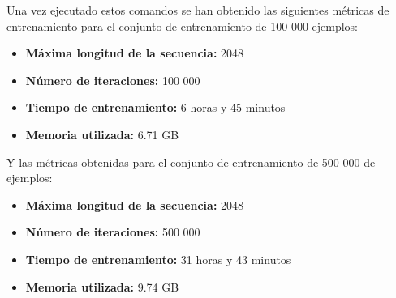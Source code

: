 Una vez ejecutado estos comandos se han obtenido las siguientes métricas de entrenamiento
para el conjunto de entrenamiento de 100 000 ejemplos:

\begin{itemize}
    \item \textbf{Máxima longitud de la secuencia:} 2048
    \item \textbf{Número de iteraciones:} 100 000
    \item \textbf{Tiempo de entrenamiento:} 6 horas y 45 minutos
    \item \textbf{Memoria utilizada:} 6.71 GB
\end{itemize}

Y las métricas obtenidas para el conjunto de entrenamiento de 500 000 de ejemplos:

\begin{itemize}
    \item \textbf{Máxima longitud de la secuencia:} 2048
    \item \textbf{Número de iteraciones:} 500 000
    \item \textbf{Tiempo de entrenamiento:} 31 horas y 43 minutos
    \item \textbf{Memoria utilizada:} 9.74 GB
\end{itemize}
